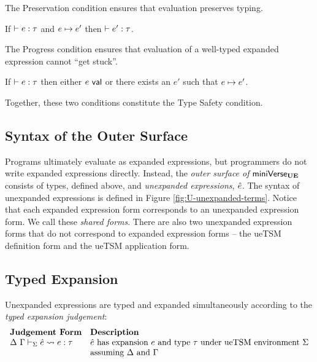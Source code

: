 The Preservation condition ensures that evaluation preserves typing.  
\begin{condition}[Preservation]\label{condition:preservation-U} If $\vdash e : \tau$ and $e \mapsto e'$ then $\vdash e' : \tau$. \end{condition}
The Progress condition ensures that evaluation of a well-typed expanded expression cannot ``get stuck''.
\begin{condition}[Progress]\label{condition:progress-U} If $\vdash e : \tau$ then either $e~\mathsf{val}$ or there exists an $e'$ such that $e \mapsto e'$. \end{condition}
Together, these two conditions constitute the Type Safety condition.

\subsection{Syntax of the Outer Surface}
Programs ultimately evaluate as expanded expressions, but programmers do not write expanded expressions directly. Instead, the \emph{outer surface of} $\mathsf{miniVerse}_\textbf{UE}$ consists of types, defined above, and \emph{unex\-panded expressions}, $\hat{e}$. The syntax of unexpanded expressions is defined in Figure \ref{fig:U-unexpanded-terms}. Notice that each expanded expression form corresponds to an unexpanded expression form. We call these \emph{shared forms}. There are also two unexpanded expression forms that do not correspond to expanded expression forms -- the ueTSM definition form and the ueTSM application form.%

\subsection{Typed Expansion}\label{sec:typed-expansion-U}
Unexpanded expressions are typed and expanded simultaneously according to the \emph{typed expansion judgement}:
\[\begin{array}{ll}
\textbf{Judgement Form} & \textbf{Description}\\
\Delta~\Gamma \vdash_{\Sigma} \hat{e} \leadsto e : \tau & \text{$\hat{e}$ has expansion $e$ and type $\tau$ under ueTSM environment $\Sigma$}\\
& \text{assuming $\Delta$ and $\Gamma$}
\end{array}\]

